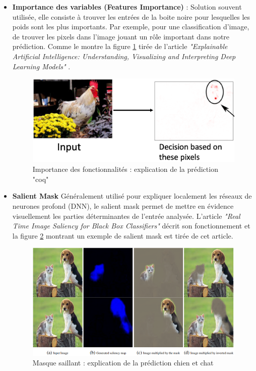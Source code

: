 \begin{itemize}
    \item \textbf{Importance des variables (Features Importance)} : Solution souvent utilisée, elle consiste à trouver les entrées de la boite noire pour lesquelles les poids sont les plus importants. Par exemple, pour une classification d'image, de trouver les pixels dans l'image jouant un rôle important dans notre prédiction. Comme le montre la figure \ref{chickenPixel} tirée de l'article \textit{"Explainable Artificial Intelligence: Understanding, Visualizing and Interpreting Deep Learning Models"} \cite{explainingIA}.\\
    \begin{figure}[h]
        \centering
        \includegraphics[scale=0.35]{src_img/chickenPixel.png}
        \caption{Importance des fonctionnalités : explication de la prédiction "coq"}
        \label{chickenPixel}
    \end{figure}
    
    \item \textbf{Salient Mask} Généralement utilisé pour expliquer localement les réseaux de neurones profond (DNN), le salient mask permet de mettre en évidence visuellement les parties déterminantes de l'entrée analysée. L'article \textit{"Real Time Image Saliency for Black Box Classifiers"}\cite{silentMask} décrit son fonctionnement et la figure \ref{silentMaskExemple} montrant un exemple de salient mask est tirée de cet article.
    \begin{figure}[h]
        \centering
        \includegraphics[scale=0.85]{src_img/silentMaskExemple.PNG}
        \caption{Masque saillant : explication de la prédiction chien et chat}
        \label{silentMaskExemple}
    \end{figure}
    

\end{itemize}
